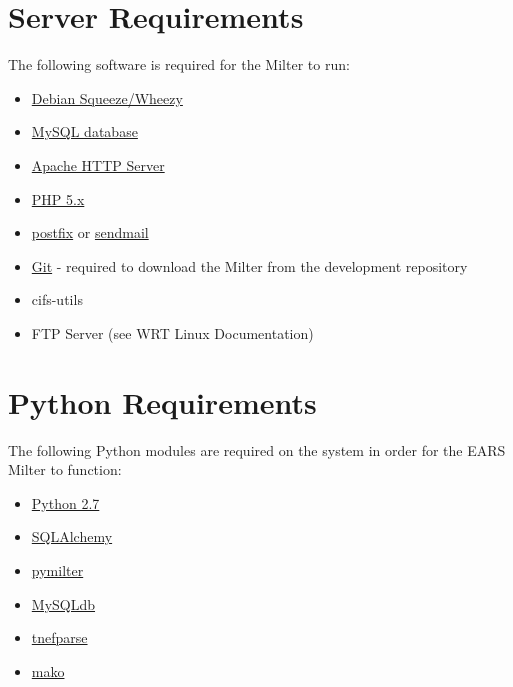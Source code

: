 \documentclass[letterpaper,10pt,english]{sphinxmanual}
\begin{document}
\section{Server Requirements}
\label{requirements:server-requirements}
The following software is required for the Milter to run:
\begin{itemize}
\item {} 
\href{http://www.debian.org/releases}{Debian Squeeze/Wheezy}

\item {} 
\href{http://www.mysql.com}{MySQL database}

\item {} 
\href{http://projects.apache.org/projects/http\_server.html}{Apache HTTP Server}

\item {} 
\href{http://www.php.net}{PHP 5.x}

\item {} 
\href{http://www.postfix.org}{postfix} or \href{http://www.sendmail.com/sm/open\_source/docs/}{sendmail}

\item {} 
\href{http://git-scm.com}{Git} - required to download the Milter from the development repository

\item {} 
cifs-utils

\item {} 
FTP Server (see WRT Linux Documentation)

\end{itemize}


\section{Python Requirements}
\label{requirements:python-requirements}
The following Python modules are required on the system in order for the EARS Milter to function:
\begin{itemize}
\item {} 
\href{http://python.org}{Python 2.7}

\item {} 
\href{http://sqlalchemy.org}{SQLAlchemy}

\item {} 
\href{http://www.bmsi.com/python/milter.html}{pymilter}

\item {} 
\href{http://mysql-python.sourceforge.net/MySQLdb.html}{MySQLdb}

\item {} 
\href{https://github.com/koodaamo/tnefparse}{tnefparse}

\item {} 
\href{http://www.makotemplates.org/}{mako}

\end{itemize}
\end{document}
